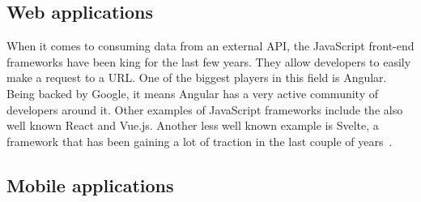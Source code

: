\subsection{Web applications}

When it comes to consuming data from an external API, the JavaScript front-end frameworks have been king for the last few years. They allow developers to easily make a request to a URL. One of the biggest players in this field is Angular. Being backed by Google, it means Angular has a very active community of developers around it. Other examples of JavaScript frameworks include the also well known React and Vue.js. Another less well known example is Svelte, a framework that has been gaining a lot of traction in the last couple of years~\autocite{Uzayr2019}.

\subsection{Mobile applications}